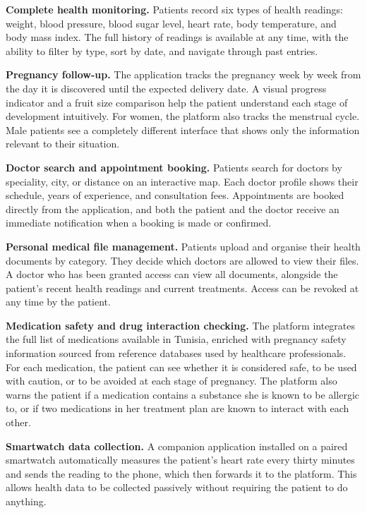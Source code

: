 \textbf{Complete health monitoring.} Patients record six types of health readings: weight,
blood pressure, blood sugar level, heart rate, body temperature, and body mass index. The
full history of readings is available at any time, with the ability to filter by type, sort by
date, and navigate through past entries.

\textbf{Pregnancy follow-up.} The application tracks the pregnancy week by week from
the day it is discovered until the expected delivery date. A visual progress indicator and a
fruit size comparison help the patient understand each stage of development intuitively.
For women, the platform also tracks the menstrual cycle. Male patients see a completely
different interface that shows only the information relevant to their situation.

\textbf{Doctor search and appointment booking.} Patients search for doctors by speciality,
city, or distance on an interactive map. Each doctor profile shows their schedule, years
of experience, and consultation fees. Appointments are booked directly from the
application, and both the patient and the doctor receive an immediate notification when a
booking is made or confirmed.

\textbf{Personal medical file management.} Patients upload and organise their health
documents by category. They decide which doctors are allowed to view their files. A doctor
who has been granted access can view all documents, alongside the patient's recent health
readings and current treatments. Access can be revoked at any time by the patient.

\textbf{Medication safety and drug interaction checking.} The platform integrates the full
list of medications available in Tunisia, enriched with pregnancy safety information
sourced from reference databases used by healthcare professionals. For each medication,
the patient can see whether it is considered safe, to be used with caution, or to be avoided
at each stage of pregnancy. The platform also warns the patient if a medication contains a
substance she is known to be allergic to, or if two medications in her treatment plan are
known to interact with each other.

\textbf{Smartwatch data collection.} A companion application installed on a paired
smartwatch automatically measures the patient's heart rate every thirty minutes and sends
the reading to the phone, which then forwards it to the platform. This allows health data
to be collected passively without requiring the patient to do anything.

